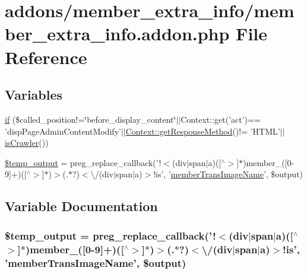 \hypertarget{member__extra__info_8addon_8php}{\section{addons/member\-\_\-extra\-\_\-info/member\-\_\-extra\-\_\-info.addon.\-php File Reference}
\label{member__extra__info_8addon_8php}
}
\subsection*{Variables}
\begin{DoxyCompactItemize}
\item 
\hyperlink{member__extra__info_8addon_8php_a29031816e50a8f742422e671b2bef9b2}{if} (\$called\-\_\-position!=\char`\"{}before\-\_\-display\-\_\-content\char`\"{}$|$$|$Context\-::get('act')== 'disp\-Page\-Admin\-Content\-Modify'$|$$|$\hyperlink{classContext_a1d02a15209360034cd719d8b08cb5061}{Context\-::get\-Response\-Method}()!= 'H\-T\-M\-L'$|$$|$\hyperlink{func_8inc_8php_a490ffbd4821da1995c76c381553d5b3d}{is\-Crawler}())
\item 
\hyperlink{member__extra__info_8addon_8php_a5866ef6f77cbeaf87d8208cf805bbc3d}{\$temp\-\_\-output} = preg\-\_\-replace\-\_\-callback('!$<$(div$|$span$|$a)(\mbox{[}$^\wedge$$>$\mbox{]}$\ast$)member\-\_\-(\mbox{[}0-\/9\mbox{]}+)(\mbox{[}$^\wedge$$>$\mbox{]}$\ast$)$>$(.$\ast$?)$<$\textbackslash{}/(div$|$span$|$a)$>$!is', '\hyperlink{member__extra__info_8lib_8php_a21882e797e0da66aed32f1cf3053eaf2}{member\-Trans\-Image\-Name}', \$output)
\end{DoxyCompactItemize}


\subsection{Variable Documentation}
\hypertarget{member__extra__info_8addon_8php_a5866ef6f77cbeaf87d8208cf805bbc3d}{
\subsubsection[{\$temp\-\_\-output}]{\setlength{\rightskip}{0pt plus 5cm}\$temp\-\_\-output = preg\-\_\-replace\-\_\-callback('!$<$(div$|$span$|$a)(\mbox{[}$^\wedge$$>$\mbox{]}$\ast$)member\-\_\-(\mbox{[}0-\/9\mbox{]}+)(\mbox{[}$^\wedge$$>$\mbox{]}$\ast$)$>$(.$\ast$?)$<$\textbackslash{}/(div$|$span$|$a)$>$!is', '{\bf member\-Trans\-Image\-Name}', \$output)}}\label{member__extra__info_8addon_8php_a5866ef6f77cbeaf87d8208cf805bbc3d}



